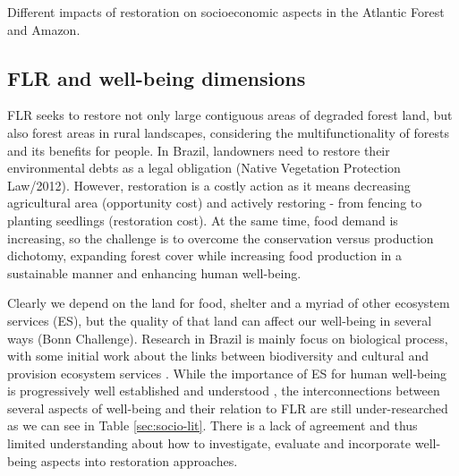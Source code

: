 \begin{table}
\caption{Different impacts of restoration on socioeconomic aspects in the Atlantic Forest and Amazon.}

 \label{table:socio}
\end{table}



\subsection{\large FLR and well-being dimensions} \label{subsec:socio-well}

FLR seeks to restore not only large contiguous areas of degraded forest land, but also forest areas in rural landscapes, considering the multifunctionality of forests and its benefits for people. In Brazil, landowners need to restore their environmental debts as a legal obligation (Native Vegetation Protection Law/2012). However, restoration is a costly action as it means decreasing agricultural area (opportunity cost) and actively restoring - from fencing to planting seedlings (restoration cost). At the same time, food demand is increasing, so the challenge is to overcome the conservation versus production dichotomy, expanding forest cover while increasing food production in a sustainable manner and enhancing human well-being.

Clearly we depend on the land for food, shelter and a myriad of other ecosystem services (ES), but the quality of that land can affect our well-being in several ways (Bonn Challenge). Research in Brazil is mainly focus on biological process, with some initial work about the links between biodiversity and cultural and provision ecosystem services \citep{Pires2018}. While the importance of ES for human well-being is progressively well established and understood \citep{Leviston2018}, the interconnections between several aspects of well-being and their relation to FLR are still under-researched as we can see in Table \ref{sec:socio-lit}. There is  a lack of agreement and thus limited understanding about how to investigate, evaluate and incorporate well-being aspects into restoration approaches.
 
